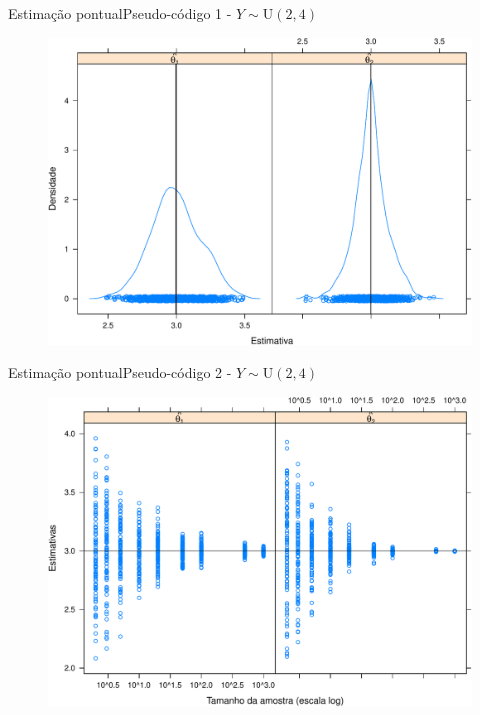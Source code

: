 \documentclass[10pt]{beamer}\usepackage[]{graphicx}\usepackage[]{color}
\theoremstyle{definition}
\begin{document}
\begin{frame}[fragile]{Estimação pontual}{Pseudo-código 1 - $Y \sim \text{U}(2,4)$}
  \begin{figure}[h]
    \centering
    \includegraphics[width=1\textwidth]{vies_uniforme-crop}
  \end{figure}
\end{frame}

\begin{frame}[fragile]{Estimação pontual}{Pseudo-código 2 - $Y \sim \text{U}(2,4)$}
  \begin{figure}[h]
    \centering
    \includegraphics[width=1\textwidth]{consistencia_uniforme-crop}
  \end{figure}
\end{frame}
\end{document}
